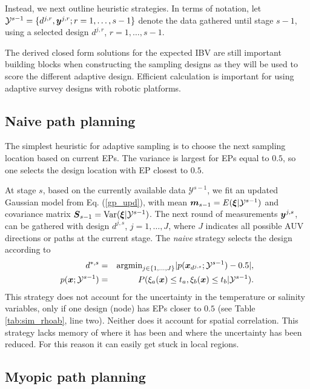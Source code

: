 \documentclass[aoas]{imsart}
\begin{document}
Instead, we next outline heuristic strategies. In terms of notation, let $\mathcal{Y}^{s-1} =\{d^{j,r}, {\boldsymbol y}^{j,r} ; r=1,\ldots,s-1 \}$ denote the data gathered until stage $s-1$, using a selected design $d^{j,r}$, $r=1,\ldots,s-1$. 

The derived closed form solutions for the expected IBV are still important building blocks when constructing the sampling designs as they will be used to score the different adaptive design. Efficient calculation is important for using adaptive survey designs with robotic platforms. 
 
\subsection{Naive path planning}
\label{naive}

The simplest heuristic for adaptive sampling is to choose the next sampling location based on current EPs. The variance is largest for EPs equal to $0.5$, so one selects the design location with EP closest to $0.5$. 

At stage $s$, based on the currently available data $\mathcal{Y}^{s-1}$, we fit an updated Gaussian model from Eq. (\ref{gp_upd}), with mean ${\boldsymbol m}_{s-1}=E({\boldsymbol \xi}|\mathcal{Y}^{s-1})$ and covariance matrix ${\boldsymbol S}_{s-1}=\mbox{Var}({\boldsymbol \xi}|\mathcal{Y}^{s-1})$. 
The next round of measurements ${\boldsymbol y}^{j,s}$, can be gathered with design $d^{j,s}$, $j=1,\ldots,J$, where $J$ indicates all possible AUV directions or paths at the current stage. The {\it{naive}} strategy selects the design according to
\begin{eqnarray}\label{critNaive}
    d^{*,s} &=& \mbox{argmin}_{j \in \{1,\ldots,J\}} |p(\bx_{d^{j,s}};\mathcal{Y}^{s-1})-0.5|, \\
    p(\bx;\mathcal{Y}^{s-1}) &=& P(\xi_a(\bx) \leq t_a, \xi_b(\bx) \leq t_b | \mathcal{Y}^{s-1}). \nonumber
\end{eqnarray}
This strategy does not account for the uncertainty in the temperature or salinity variables, only if one design (node) has EPs closer to $0.5$ (see Table \ref{tab:sim_rhoab}, line two). Neither does it account for spatial correlation. This strategy lacks memory of where it has been and where the uncertainty has been reduced. For this reason it can easily get stuck in local regions. 

\subsection{Myopic path planning}
\label{myopic}
\end{document}

